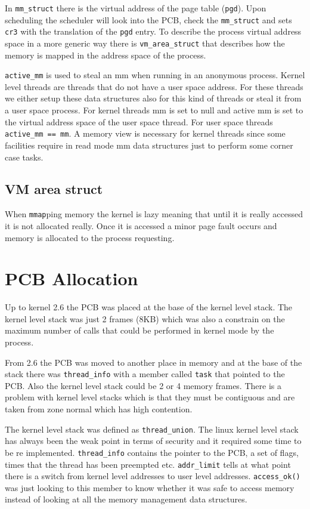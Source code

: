 \documentclass[twoside]{article}
\begin{document}
In \texttt{mm_struct} there is the virtual address of the page table
(\texttt{pgd}). Upon scheduling the scheduler will look into the PCB, check the
\texttt{mm_struct} and sets \texttt{cr3} with the translation of the \texttt{pgd}
entry. To describe the process virtual address space in a more generic way there
is \texttt{vm_area_struct} that describes how the memory is mapped in the
address space of the process.

\texttt{active_mm} is used to steal an mm when running in an anonymous process.
Kernel level threads are threads that do not have a user space address. For
these threads we either setup these data structures also for this kind of
threads or steal it from a user space process. For kernel threads mm is set to
null and active mm is set to the virtual address space of the user space thread.
For user space threads \texttt{active_mm == mm}. A memory view is necessary for
kernel threads since some facilities require in read mode mm data structures
just to perform some corner case tasks.

\subsection{VM area struct}
\label{sub:VM area struct}


When \texttt{mmap}ping memory the kernel is lazy meaning that until it is really
accessed it is not allocated really. Once it is accessed a minor page fault
occurs and memory is allocated to the process requesting.

\section{PCB Allocation}
\label{sec:PCB Allocation}


Up to kernel 2.6 the PCB was placed at the base of the kernel level stack. The
kernel level stack was just 2 frames (8KB) which was also a constrain on the
maximum number of calls that could be performed in kernel mode by the process.

From 2.6 the PCB was moved to another place in memory and at the base of the
stack there was \texttt{thread_info} with a member called \texttt{task} that
pointed to the PCB. Also the kernel level stack could be 2 or 4 memory frames.
There is a problem with kernel level stacks which is that they must be
contiguous and are taken from zone normal which has high contention.

The kernel level stack was defined as \texttt{thread_union}.
The linux kernel level stack has always been the weak
point in terms of security and it required some time to be re implemented.
\texttt{thread_info} contains the pointer to the PCB, a set of flags, times that
the thread has been preempted etc. \texttt{addr_limit} tells at what point there
is a switch from kernel level addresses to user level addresses.
\texttt{access_ok()} was just looking to this member to know whether it was safe
to access memory instead of looking at all the memory management data
structures.
\end{document}
